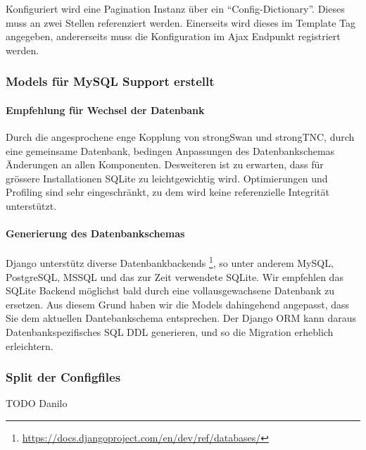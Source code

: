 Konfiguriert wird eine Pagination Instanz über ein \enquote{Config-Dictionary}.
Dieses muss an zwei Stellen referenziert werden. Einerseits wird dieses im
Template Tag angegeben, andererseits muss die Konfiguration im Ajax Endpunkt
registriert werden.

\subsubsection{Models für MySQL Support erstellt}
\paragraph{Empfehlung für Wechsel der Datenbank}
Durch die angesprochene enge Kopplung von strongSwan und strongTNC, durch eine gemeinsame Datenbank, bedingen Anpassungen des Datenbankschemas Änderungen an allen Komponenten.
Desweiteren ist zu erwarten, dass für grössere Installationen SQLite zu leichtgewichtig wird.
Optimierungen und Profiling sind sehr eingeschränkt, zu dem wird keine referenzielle Integrität unterstützt.
\paragraph{Generierung des Datenbankschemas}
Django unterstütz diverse Datenbankbackends \footnote{\url{https://docs.djangoproject.com/en/dev/ref/databases/}}, so unter anderem MySQL, PostgreSQL, MSSQL und das zur Zeit verwendete SQLite.
Wir empfehlen das SQLite Backend möglichst bald durch eine vollausgewachsene Datenbank zu ersetzen. Aus diesem Grund haben wir die Models dahingehend angepasst, dass Sie dem aktuellen Dantebankschema entsprechen. 
Der Django ORM kann daraus Datenbankspezifisches SQL DDL generieren, und so die Migration erheblich erleichtern.

\subsubsection{Split der Configfiles}
TODO Danilo

